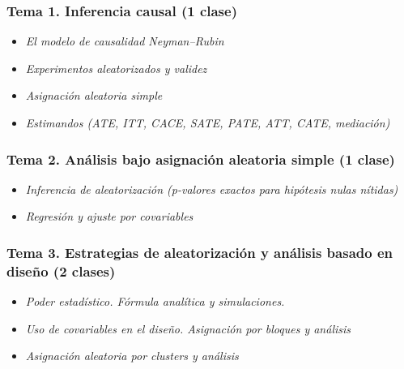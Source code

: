 \documentclass[
  12pt,
]{article}
\providecommand{\tightlist}{%
  \setlength{\itemsep}{0pt}\setlength{\parskip}{0pt}}
\begin{document}
\hypertarget{tema-1.-inferencia-causal-1-clase}{%
\subsubsection{Tema 1. Inferencia causal (1
clase)}\label{tema-1.-inferencia-causal-1-clase}}

\begin{itemize}
\tightlist
\item
  \emph{El modelo de causalidad Neyman--Rubin}
\item
  \emph{Experimentos aleatorizados y validez}
\item
  \emph{Asignación aleatoria simple}
\item
  \emph{Estimandos (ATE, ITT, CACE, SATE, PATE, ATT, CATE, mediación)}
\end{itemize}

\hypertarget{tema-2.-anuxe1lisis-bajo-asignaciuxf3n-aleatoria-simple-1-clase}{%
\subsubsection{Tema 2. Análisis bajo asignación aleatoria simple (1
clase)}\label{tema-2.-anuxe1lisis-bajo-asignaciuxf3n-aleatoria-simple-1-clase}}

\begin{itemize}
\tightlist
\item
  \emph{Inferencia de aleatorización (p-valores exactos para hipótesis
  nulas nítidas)}
\item
  \emph{Regresión y ajuste por covariables}
\end{itemize}

\hypertarget{tema-3.-estrategias-de-aleatorizaciuxf3n-y-anuxe1lisis-basado-en-diseuxf1o-2-clases}{%
\subsubsection{Tema 3. Estrategias de aleatorización y análisis basado
en diseño (2
clases)}\label{tema-3.-estrategias-de-aleatorizaciuxf3n-y-anuxe1lisis-basado-en-diseuxf1o-2-clases}}

\begin{itemize}
\tightlist
\item
  \emph{Poder estadístico. Fórmula analítica y simulaciones.}
\item
  \emph{Uso de covariables en el diseño. Asignación por bloques y
  análisis}
\item
  \emph{Asignación aleatoria por clusters y análisis}
\end{itemize}
\end{document}
